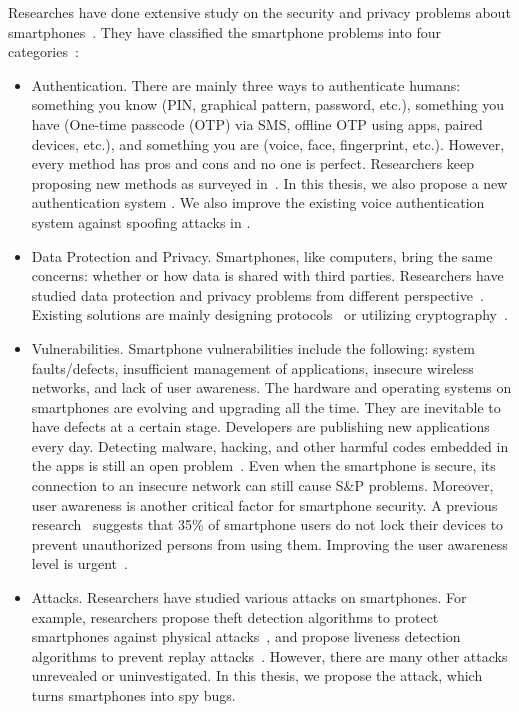 Researches have done extensive study on the security and privacy problems about smartphones~\cite{ali2019security,zaidi2016survey,chin2012measuring,khan2015survey}. They have classified the smartphone problems into four categories~\cite{zaidi2016survey}:

\begin{itemize}
	\item Authentication. There are mainly three ways to authenticate humans: something you know (PIN, graphical pattern, password, etc.), something you have (One-time passcode (OTP) via SMS, offline OTP using apps, paired devices, etc.), and something you are (voice, face, fingerprint, etc.). However, every method has pros  and cons and no one is perfect. Researchers keep proposing new methods as surveyed in~\cite{teh2016survey,spolaor2016biometric,mahfouz2017survey,vongsingthong2015survey,gupta2018demystifying}.  In this thesis, we also propose a new authentication system {\uu}. We also improve the existing voice authentication system against spoofing attacks in {\mv}.
	
	\item  Data Protection and Privacy. Smartphones, like computers, bring the same concerns: whether or how data is shared with third parties. Researchers have studied data protection and privacy problems from different perspective~\cite{muslukhov2012understanding,boyles2012privacy,wang2015know}. Existing solutions are mainly designing protocols~\cite{zegers2015lightweight,urien2013framework} or utilizing cryptography~\cite{patel2016integrated,han2016enhancing}.
	
	\item Vulnerabilities. Smartphone vulnerabilities include the following: system faults/defects, insufficient management of applications, insecure wireless networks, and lack of user awareness. The hardware and operating systems on smartphones are evolving and upgrading all the time. They are inevitable to have defects at a certain stage. Developers are publishing new applications every day. Detecting malware, hacking, and other harmful codes embedded in the apps is still an open problem~\cite{idrees2017pindroid}. Even when the smartphone is secure, its connection to an insecure network can still cause S\&P problems. Moreover, user awareness is another critical factor for smartphone security. A previous research~\cite{van2013modifying} suggests that 35\% of smartphone users do not lock their devices to prevent unauthorized persons from using them. Improving the user awareness level is urgent~\cite{koyuncu2019security}.
	
	\item Attacks. Researchers have studied various attacks on smartphones. For example, researchers propose theft detection algorithms to protect smartphones against physical attacks~\cite{chang2016smartdog}, and propose liveness detection algorithms to prevent replay attacks~\cite{zhang2016voicelive}.  However, there are many other attacks unrevealed or uninvestigated.  In this thesis, we propose the {\attackName} attack, which turns smartphones into spy bugs. 
\end{itemize}




